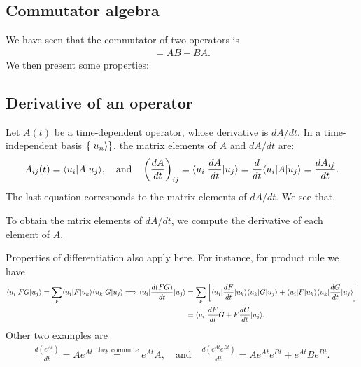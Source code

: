 \subsection{Commutator algebra}
We have seen that the commutator of two operators is 
\begin{align}
    [A,B]=AB-BA.
\end{align}
We then present some properties:
\begin{table}[htbp]
    \centering
\end{table} 
\subsection{Derivative of an operator}
Let $A(t)$ be a time-dependent operator, whose derivative is $dA/dt$. In a time-independent basis $\{|u_n\rangle\}$, the matrix elements of $A$ and $dA/dt$ are:
\begin{align}
    A_{ij}(t)=\langle u_i|A|u_j\rangle,\quad\text{and}\quad\left(\frac{dA}{dt}\right)_{ij}=\langle u_i|\frac{dA}{dt}|u_j\rangle=\frac{d}{dt}\langle u_i|A|u_j\rangle=\frac{dA_{ij}}{dt}.
\end{align}
The last equation corresponds to the matrix elements of $dA/dt$. We see that,
\begin{emphasizer}
    To obtain the mtrix elements of $dA/dt$, we compute the derivative of each element of $A$.
\end{emphasizer}

Properties of differentiation also apply here. For instance, for product rule we have
{\small
\begin{align*}
    \langle u_i|FG|u_j\rangle=\sum_k\langle u_i|F|u_k\rangle\langle u_k|G|u_j\rangle\Longrightarrow\langle u_i|\frac{d(FG)}{dt}|u_j\rangle&=\sum_k\left[\langle u_i|\frac{dF}{dt}|u_k\rangle\langle u_k|G|u_j\rangle+\langle u_i|F|u_k\rangle\langle u_k|\frac{dG}{dt}|u_j\rangle\right]\\
    &=\langle u_i|\frac{dF}{dt}G+F\frac{dG}{dt}|u_j\rangle.
\end{align*}}
Other two examples are
\begin{align*}
    \frac{d(e^{At})}{dt}=Ae^{At}\stackrel{\text{they commute}}{=}e^{At}A,\quad\text{and}\quad\frac{d(e^{At}e^{Bt})}{dt}=Ae^{At}e^{Bt}+e^{At}Be^{Bt}.
\end{align*}


